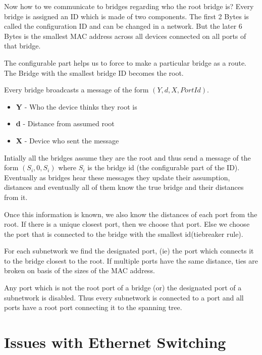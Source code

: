 \documentclass[12pt]{article}
\newcommand{\tbox}[1]{\noindent\fbox{\parbox{\textwidth}{#1}}}
\begin{document}
Now how to we communicate to bridges regarding who the root bridge is? Every bridge is 
assigned an ID which is made of two components. The first 2 Bytes is called the configuration ID and can 
be changed in a network. But the later 6 Bytes is the smallest MAC address across all devices connected on all 
ports of that bridge. 

The configurable part helps us to force to make a particular bridge as a route. The Bridge with the smallest bridge 
ID becomes the root.  

Every bridge broadcasts a message of the form \((Y,d,X,PortId)\). 
\begin{itemize}
    \item \textbf{Y} - Who the device thinks they root is 
    \item \textbf{d} - Distance from assumed root
    \item \textbf{X} - Device who sent the message
\end{itemize}


Intially all the bridges assume they are the root and thus send a message of the form \((S_i, 0, S_i)\) where 
\(S_i\) is the bridge id (the configurable part of the ID). Eventually as bridges hear these messages they update their assumption, distances 
and eventually all of them know the true bridge and their distances from it.   


Once this information is known, we also know the distances of each port from the root. If there is a unique closest port, then we choose that port. 
Else we choose the port that is connected to the bridge with the smallest id(tiebreaker rule). 

For each subnetwork we find the designated port, (ie) the port which connects it to the bridge closest to the root. If multiple 
ports have the same distance, ties are broken on basis of the sizes of the MAC address. 

Any port which is not the root port of a bridge (or) the designated port of a subnetwork is disabled. Thus every subnetwork is connected to a port and all ports 
have a root port connecting it to the spanning tree. 

\noindent\tbox{
    \begin{center}
    \textbf{\Huge Lecture 20}

    Not yet completely done
    \end{center}
}

\section{Issues with Ethernet Switching}
\end{document}
